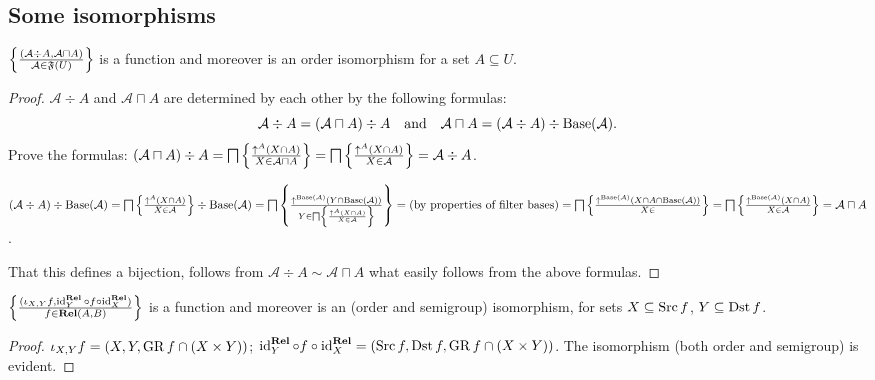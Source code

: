 
\subsection{Some isomorphisms}

\begin{prop}
  $\left\{ \frac{ (\mathcal{A} \div A , \mathcal{A} \sqcap A) }{
  \mathcal{A} \in \mathfrak{F} (U) }\right\}$ is a function and
  moreover is an order isomorphism for a set $A \subseteq U$.
\end{prop}

\begin{proof}
  $\mathcal{A} \div A$ and $\mathcal{A} \sqcap A$ are determined by each other
  by the following formulas:
  \[ \mathcal{A} \div A = (\mathcal{A} \sqcap A) \div A \quad
     \text{and} \quad \mathcal{A} \sqcap A = (\mathcal{A} \div A) \div
     \operatorname{Base} (\mathcal{A}) . \]
  Prove the formulas: $(\mathcal{A} \sqcap A) \div A = \bigsqcap \left\{ \frac{
  \uparrow^A (X \cap A) }{ X \in \mathcal{A} \sqcap A
  }\right\} = \bigsqcap \left\{ \frac{ \uparrow^A (X \cap A) }{
  X \in \mathcal{A} }\right\} = \mathcal{A} \div A$.
  
  $(\mathcal{A} \div A) \div \operatorname{Base} (\mathcal{A}) = \bigsqcap \left\{ \frac{
  \uparrow^A (X \cap A) }{ X \in \mathcal{A} }\right\}
  \div \operatorname{Base} (\mathcal{A}) = \bigsqcap \left\{ \frac{ \uparrow^{\operatorname{Base}
  (\mathcal{A})} (Y \cap \operatorname{Base} (\mathcal{A})) }{
  Y \in \bigsqcap \left\{ \frac{ \uparrow^A (X \cap A) }{
  X \in \mathcal{A} }\right\} }\right\} = \text{(by properties of
  filter bases)} = \bigsqcap \left\{ \frac{ \uparrow^{\operatorname{Base} (\mathcal{A})} (X
  \cap A \cap \operatorname{Base} (\mathcal{A})) }{ X \in
  }\right\} = \bigsqcap \left\{ \frac{ \uparrow^{\operatorname{Base}
  (\mathcal{A})} (X \cap A) }{ X \in \mathcal{A}
  }\right\} = \mathcal{A} \sqcap A$.
  
  That this defines a bijection, follows from $\mathcal{A} \div A \sim
  \mathcal{A} \sqcap A$ what easily follows from the above formulas.
\end{proof}

\begin{prop}
  $\left\{ \frac{ (\iota_{X, Y} f , \operatorname{id}^{\mathbf{Rel}}_Y \circ f \circ
  \operatorname{id}^{\mathbf{Rel}}_X) }{ f \in
  \mathbf{Rel} (A , B) }\right\}$ is a function and moreover is an
  (order and semigroup) isomorphism, for sets $X \subseteq \operatorname{Src} f$, $Y
  \subseteq \operatorname{Dst} f$.
\end{prop}

\begin{proof}
  $\iota_{X, Y} f = (X , Y , \operatorname{GR} f \cap (X \times Y))$;
  $\operatorname{id}^{\mathbf{Rel}}_Y \circ f \circ
  \operatorname{id}^{\mathbf{Rel}}_X = (\operatorname{Src} f , \operatorname{Dst} f ,
  \operatorname{GR} f \cap (X \times Y))$. The isomorphism (both order and semigroup)
  is evident.
\end{proof}

